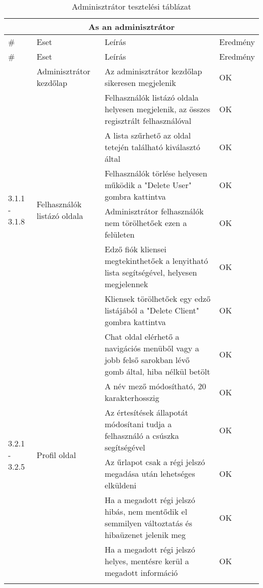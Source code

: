 \begin{center}
	\begin{longtable}{ | p{} | p{} | p{} | p{} | }
			
			\hline
			\multicolumn{4}{|c|}{\textbf{As an adminisztrátor}}
			\\ \hline
			
			\# & Eset & Leírás & Eredmény
			\\ \hline \hline
			\endfirsthead %
			
			\hline
			\# & Eset & Leírás & Eredmény
			\\ \hline \hline
			\endhead %
			
			\hline
			\endfoot %
			
			\endlastfoot %

			\multirow{1}{=}{3.0.1} 
			& \multirow{1}{=}{Adminisztrátor kezdőlap} 
			& Az adminisztrátor kezdőlap sikeresen megjelenik 
			& OK \\
			\hline
			
			\multirow{6}{=}{3.1.1 - 3.1.8} 
			& \multirow{6}{=}{Felhasználók listázó oldala} 
			& Felhasználók listázó oldala helyesen megjelenik, az összes regisztrált felhasználóval
			& OK \\
			\cline{3-4}
			& & A lista szűrhető az oldal tetején található kiválasztó által
			& OK \\
			\cline{3-4}
			& & Felhasználók törlése helyesen működik a "Delete User" gombra kattintva
			& OK \\
			\cline{3-4}
			& & Adminisztrátor felhasználók nem törölhetőek ezen a felületen
			& OK \\
			\cline{3-4}
			& & Edző fiók kliensei megtekinthetőek a lenyitható lista segítségével, helyesen megjelennek
			& OK \\
			\cline{3-4}
			& & Kliensek törölhetőek egy edző listájából a "Delete Client" gombra kattintva
			& OK \\
			\hline

			\multirow{6}{=}{3.2.1 - 3.2.5} 
			& \multirow{6}{=}{Profil oldal}
			& Chat oldal elérhető a navigációs menüből vagy a jobb felső sarokban lévő gomb által, hiba nélkül betölt
			& OK \\
			\cline{3-4}
			& & A név mező módosítható, 20 karakterhosszig
			& OK \\
			\cline{3-4}
			& & Az értesítések állapotát módosítani tudja a felhasználó a csúszka segítségével
			& OK \\
			\cline{3-4}
			& & Az űrlapot csak a régi jelszó megadása után lehetséges elküldeni
			& OK \\
			\cline{3-4}
			& & Ha a megadott régi jelszó hibás, nem mentődik el semmilyen változtatás és hibaüzenet jelenik meg
			& OK \\
			\cline{3-4}
			& & Ha a megadott régi jelszó helyes, mentésre kerül a megadott információ
			& OK \\
			\hline

			\caption{Adminisztrátor tesztelési táblázat}
			\label{tab:testadmin}       
	\end{longtable}
\end{center}


